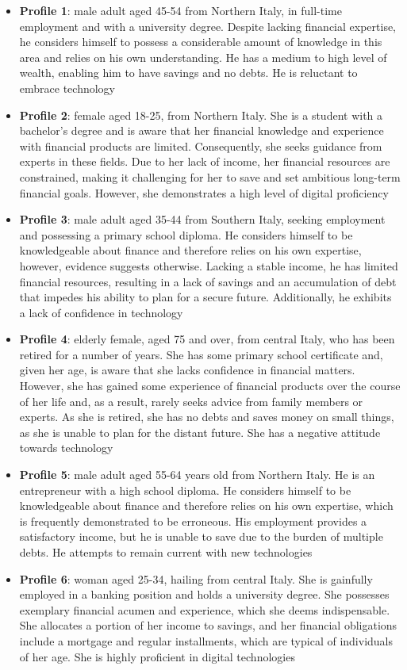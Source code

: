 \documentclass[a4paper,11pt]{article}
\begin{document}
\begin{itemize}
    \item \textbf{Profile 1}: male adult aged 45-54 from Northern Italy, in full-time employment and with a university degree. Despite lacking financial expertise, he considers himself to possess a considerable amount of knowledge in this area and relies on his own understanding. He has a medium to high level of wealth, enabling him to have savings and no debts. He is reluctant to embrace technology
    \item \textbf{Profile 2}: female aged 18-25, from Northern Italy. She is a student with a bachelor's degree and is aware that her financial knowledge and experience with financial products are limited. Consequently, she seeks guidance from experts in these fields. Due to her lack of income, her financial resources are constrained, making it challenging for her to save and set ambitious long-term financial goals. However, she demonstrates a high level of digital proficiency
    \item \textbf{Profile 3}: male adult aged 35-44 from Southern Italy, seeking employment and possessing a primary school diploma. He considers himself to be knowledgeable about finance and therefore relies on his own expertise, however, evidence suggests otherwise. Lacking a stable income, he has limited financial resources, resulting in a lack of savings and an accumulation of debt that impedes his ability to plan for a secure future. Additionally, he exhibits a lack of confidence in technology
    \item \textbf{Profile 4}: elderly female, aged 75 and over, from central Italy, who has been retired for a number of years. She has some primary school certificate and, given her age, is aware that she lacks confidence in financial matters. However, she has gained some experience of financial products over the course of her life and, as a result, rarely seeks advice from family members or experts. As she is retired, she has no debts and saves money on small things, as she is unable to plan for the distant future. She has a negative attitude towards technology
    \item \textbf{Profile 5}: male adult aged 55-64 years old from Northern Italy. He is an entrepreneur with a high school diploma. He considers himself to be knowledgeable about finance and therefore relies on his own expertise, which is frequently demonstrated to be erroneous. His employment provides a satisfactory income, but he is unable to save due to the burden of multiple debts. He attempts to remain current with new technologies
    \item \textbf{Profile 6}: woman aged 25-34, hailing from central Italy. She is gainfully employed in a banking position and holds a university degree. She possesses exemplary financial acumen and experience, which she deems indispensable. She allocates a portion of her income to savings, and her financial obligations include a mortgage and regular installments, which are typical of individuals of her age. She is highly proficient in digital technologies 
\end{itemize}
\end{document}

